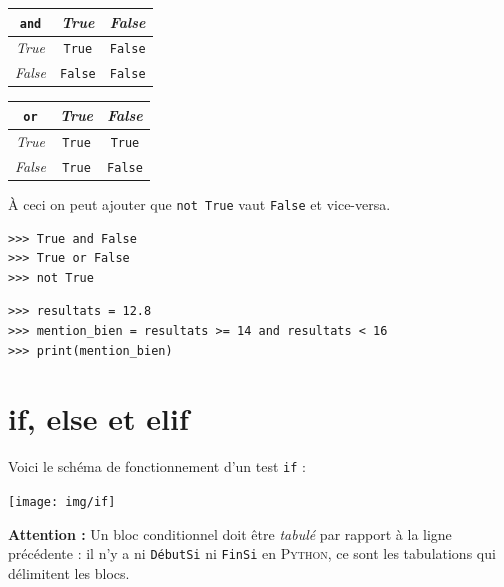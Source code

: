 \begin{center}
	\begin{tabular}{|c|c|c|}
		\hline
		\texttt{and} & \textit{True}        & \textit{False}       \\
		\hline
		\textit{True}      & \texttt{True}  & \texttt{False} \\
		\hline
		\textit{False}     & \texttt{False} & \texttt{False} \\
		\hline
	\end{tabular}\hspace{2em}
	\begin{tabular}{|c|c|c|}
		\hline
		\texttt{or} & \textit{True}       & \textit{False}       \\
		\hline
		\textit{True}     & \texttt{True} & \texttt{True}  \\
		\hline
		\textit{False}    & \texttt{True} & \texttt{False} \\
		\hline
	\end{tabular}
\end{center}
À ceci on peut ajouter que \texttt{not True} vaut \texttt{False} et vice-versa.

\begin{pys}
	\begin{verbatim}
>>> True and False
>>> True or False
>>> not True
    \end{verbatim}
\end{pys}

\begin{pys}
	\begin{verbatim}
>>> resultats = 12.8
>>> mention_bien = resultats >= 14 and resultats < 16
>>> print(mention_bien)
    \end{verbatim}
\end{pys}

\section{if, else et elif}
Voici le schéma de fonctionnement d'un test \texttt{if} :
\begin{center}
	\texttt{[image: img/if]}
\end{center}

\textbf{Attention :} Un bloc conditionnel doit être \textit{tabulé} par rapport à la ligne précédente : il n'y a ni \texttt{DébutSi}  ni \texttt{FinSi}
en \textsc{Python}, ce sont les tabulations qui délimitent les blocs.

